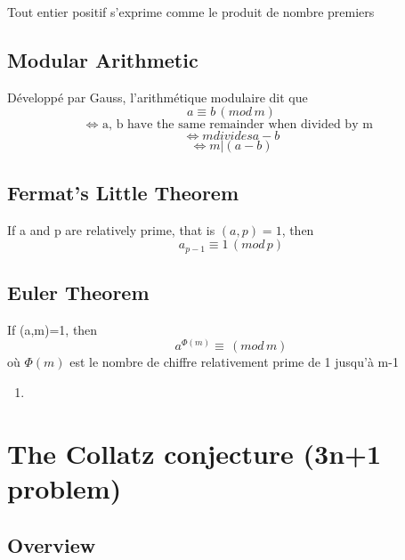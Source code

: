 \documentclass{article}
\begin{document}
\begin{theorem}
    Tout entier positif s'exprime comme le produit de nombre premiers
\end{theorem}

\subsection{Modular Arithmetic}

\begin{theorem}
    Développé par Gauss, l'arithmétique modulaire dit que
    $$ a \equiv b \, (mod \, m) $$ $$ \Longleftrightarrow
    \text{ a, b have the same remainder when divided by m } $$
    $$ \Longleftrightarrow m divides a-b $$
    $$ \Longleftrightarrow m|(a-b)$$
\end{theorem}

\subsection{Fermat's Little Theorem}

\begin{theorem}
    If a and p are relatively prime, that is $ (a,p) = 1$, then
    $$ a_{p-1} \equiv 1 \, (mod \, p)$$
\end{theorem}

\subsection{Euler Theorem}

\begin{theorem}
    If (a,m)=1, then $$ a^{\Phi (m)} \equiv \, (mod \, m) $$
    où $\Phi(m)$ est le nombre de chiffre relativement prime de 1 jusqu'à
    m-1
\end{theorem}

\begin{problem}
    \begin{enumerate}
        \item
    \end{enumerate}
\end{problem}


\section{The Collatz conjecture (3n+1 problem)}
\subsection{Overview}%
\label{sub:Overview}
\end{document}
